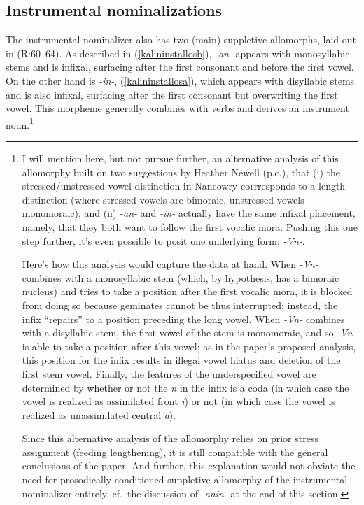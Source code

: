 \documentclass[output=paper]{langscibook}
\begin{document}
\subsection{Instrumental nominalizations}\label{sec:kalin:3.2}\largerpage[-1]

The instrumental nominalizer also has two (main) suppletive allomorphs, laid out in \Next (R:60--64). As described in (\ref{kalininstallosb}), \textit{-an-} appears with monosyllabic stems and is infixal, surfacing after the first consonant and before the first vowel. On the other hand is \textit{-in-}, (\ref{kalininstallosa}), which appears with disyllabic stems and is also infixal, surfacing after the first consonant but overwriting the first vowel. This morpheme generally combines with verbs and derives an instrument noun.{\footnote{I will mention here, but not pursue further, an alternative analysis of this allomorphy built on two suggestions by Heather Newell (p.c.), that (i) the stressed/unstressed vowel distinction in Nancowry corrresponds to a length distinction (where stressed vowels are bimoraic, unstressed vowels monomoraic), and (ii) \textit{-an-} and \textit{-in-} actually have the same infixal placement, namely, that they both want to follow the first vocalic mora. Pushing this one step further, it's even possible to posit one underlying form, \textit{-Vn-}. 

Here's how this analysis would capture the data at hand. When \textit{-Vn-} combines with a monosyllabic stem (which, by hypothesis, has a bimoraic nucleus) and tries to take a position after the first vocalic mora, it is blocked from doing so because geminates cannot be thus interrupted; instead, the infix ``repairs'' to a position preceding the long vowel. When \textit{-Vn-} combines with a disyllabic stem, the first vowel of the stem is monomoraic, and so \textit{-Vn-} is able to take a position after this vowel; as in the paper's proposed analysis, this position for the infix results in illegal vowel hiatus and deletion of the first stem vowel. Finally, the features of the underspecified vowel are determined by whether or not the \textit{n} in the infix is a coda (in which case the vowel is realized as assimilated front \textit{i}) or not (in which case the vowel is realized as unassimilated central \textit{a}). 

Since this alternative analysis of the allomorphy relies on prior stress assignment (feeding lengthening), it is still compatible with the general conclusions of the paper. And further, this explanation would not obviate the need for prosodically-conditioned suppletive allomorphy of the instrumental nominalizer entirely, cf.\ the discussion of \textit{-anin-} at the end of this section.\label{kalinfnheather}}}\pagebreak
\end{document}
